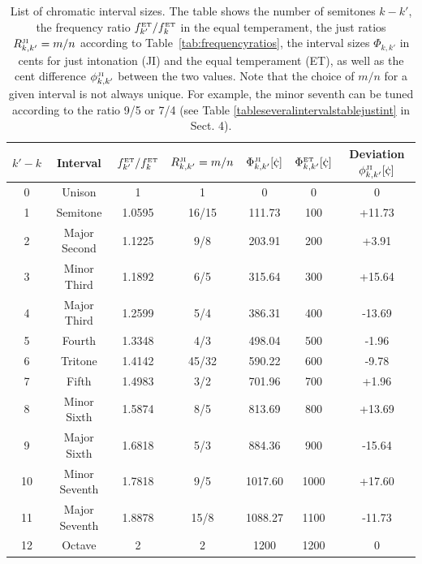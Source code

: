 \begin{table}
\centering
\footnotesize
\begin{tabular}{|c|c||c|c||c|c|c|} \hline
$k'-k$ & Interval& $f^{\rm\scriptscriptstyle ET}_{k'}/f^{\rm\scriptscriptstyle ET}_{k}$ & $R^{\rm\scriptscriptstyle JI}_{k,k'}=m/n$ & $\Phi^\JI_{k,k'}[\cent]$ & $\Phi^\ET_{k,k'}[\cent]$ & Deviation  $\phi^\JI_{k,k'}[\cent]$ \\ \hline 
0 & Unison 		& 1		& 1 	& 0 & 0 & 0 \\
1 & Semitone 		& 1.0595	& 16/15 & 111.73 & 100 & +11.73 \\
2 & Major Second 	& 1.1225 	& 9/8 	& 203.91 & 200 & +3.91 \\
3 & Minor Third 	& 1.1892	& 6/5 	& 315.64 & 300 & +15.64 \\
4 & Major Third 	& 1.2599	& 5/4 	& 386.31 & 400 & -13.69 \\
5 & Fourth 		& 1.3348 	& 4/3 	& 498.04 & 500 & -1.96 \\
6 & Tritone 		& 1.4142	& 45/32 & 590.22 & 600 & -9.78 \\
7 & Fifth 		& 1.4983	& 3/2 	& 701.96 & 700 & +1.96 \\
8 & Minor Sixth 	& 1.5874	& 8/5 	& 813.69 & 800 & +13.69 \\
9 & Major Sixth 	& 1.6818	& 5/3 	& 884.36 & 900 & -15.64 \\
10 & Minor Seventh 	& 1.7818	& 9/5 	& 1017.60 & 1000 & +17.60 \\
11 & Major Seventh 	& 1.8878	& 15/8	& 1088.27 & 1100 & -11.73 \\
12 & Octave 		& 2		& 2 	& 1200 & 1200 & 0 \\
\hline 
\end{tabular}
\caption{\label{tablejustint} List of chromatic interval sizes. The table shows the number of semitones $k-k'$, the frequency ratio $f^{\rm\scriptscriptstyle ET}_{k'}/f^{\rm\scriptscriptstyle ET}_{k}$ in the equal temperament, the just ratios $R^{\rm\scriptscriptstyle JI}_{k,k'}=m/n$ according to Table~\ref{tab:frequencyratios}, the interval sizes $\Phi_{k,k'}$ in cents for just intonation (JI) and the equal temperament (ET), as well as the cent difference $\phi^{\rm\scriptscriptstyle JI}_{k,k'}$ between the two values. Note that the choice of $m/n$ for a given interval is not always unique. For example, the minor seventh can be tuned according to the ratio 9/5 or 7/4 (see Table \ref{tableseveralintervalstablejustint} in Sect. 4).}
\end{table}


